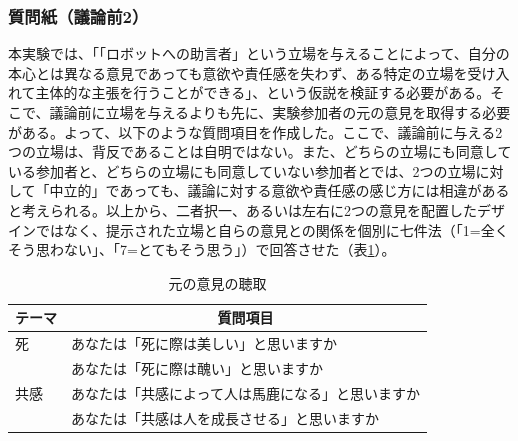 \documentclass[11pt, a4paper]{jreport} %
\begin{document}
\subsubsection*{質問紙（議論前2）}
本実験では、「「ロボットへの助言者」という立場を与えることによって、自分の本心とは異なる意見であっても意欲や責任感を失わず、ある特定の立場を受け入れて主体的な主張を行うことができる」、という仮説を検証する必要がある。そこで、議論前に立場を与えるよりも先に、実験参加者の元の意見を取得する必要がある。よって、以下のような質問項目を作成した。ここで、議論前に与える2つの立場は、背反であることは自明ではない。また、どちらの立場にも同意している参加者と、どちらの立場にも同意していない参加者とでは、2つの立場に対して「中立的」であっても、議論に対する意欲や責任感の感じ方には相違があると考えられる。以上から、二者択一、あるいは左右に2つの意見を配置したデザインではなく、提示された立場と自らの意見との関係を個別に七件法（「1=全くそう思わない」、「7=とてもそう思う」）で回答させた（表\ref{tab:motonoiken}）。
\begin{table}[H]
\caption{元の意見の聴取}
\centering
\label{tab:motonoiken}
\begin{tabular}{@{}ll@{}}
\toprule
\multicolumn{1}{c}{テーマ} & \multicolumn{1}{c}{質問項目}  \\ \midrule
死                        & あなたは「死に際は美しい」と思いますか       \\
                         & あなたは「死に際は醜い」と思いますか        \\
共感                       & あなたは「共感によって人は馬鹿になる」と思いますか \\
                         & あなたは「共感は人を成長させる」と思いますか    \\ \bottomrule
\end{tabular}
\end{table}

\end{document}
